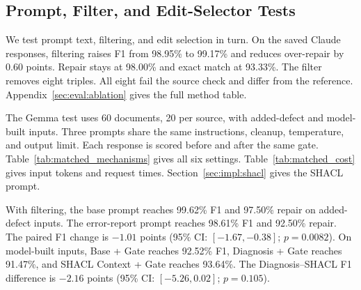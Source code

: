 \subsection{Prompt, Filter, and Edit-Selector Tests}
\label{sec:eval:router}
\label{sec:eval:mechanisms}

We test prompt text, filtering, and edit selection in turn.
On the saved Claude responses, filtering raises F1 from 98.95\% to 99.17\%
and reduces over-repair by 0.60 points. Repair stays at 98.00\% and exact
match at 93.33\%. The filter removes eight triples. All eight fail the
source check and differ from the reference.
Appendix~\ref{sec:eval:ablation} gives the full method table.

\begin{table}[t]
\centering
\caption{Gemma prompt tests on 60 documents per input group. Each raw/gated pair uses the same response.}
\label{tab:matched_mechanisms}
\small
{}
\end{table}


The Gemma test uses 60 documents, 20 per source, with added-defect and
model-built inputs. Three prompts share the same instructions, cleanup,
temperature, and output limit. Each response is scored before and after
the same gate. Table~\ref{tab:matched_mechanisms} gives all six settings.
Table~\ref{tab:matched_cost} gives input tokens and request times.
Section~\ref{sec:impl:shacl} gives the SHACL prompt.

With filtering, the base prompt reaches 99.62\% F1 and 97.50\% repair on
added-defect inputs. The error-report prompt reaches 98.61\% F1 and 92.50\%
repair. The paired F1 change is $-1.01$ points
(95\% CI: $[-1.67,-0.38]$; $p=0.0082$).
On model-built inputs, Base + Gate reaches 92.52\% F1,
Diagnosis + Gate reaches 91.47\%, and SHACL Context + Gate reaches 93.64\%.
The Diagnosis--SHACL F1 difference is $-2.16$ points
(95\% CI: $[-5.26,0.02]$; $p=0.105$).

